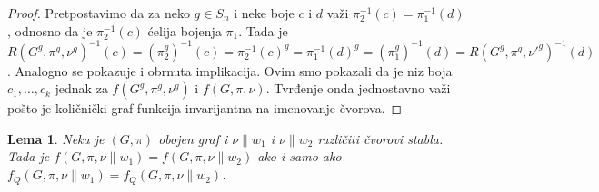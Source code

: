 \documentclass[12pt,oneside]{memoir}
\newtheorem{lemma}{Lema}
\theoremstyle{definition}
\begin{document}
  \begin{proof}
	  Pretpostavimo da za neko $g \in S_n$ i neke boje $c$ i $d$ važi
	  $\pi_2^{-1}(c) = \pi_1^{-1}(d)$, odnosno da je $\pi_2^{-1}(c)$ ćelija
	  bojenja $\pi_1$.  Tada je $R(G^g, \pi^g, \nu^g)^{-1}(c) =
	  (\pi_2^g)^{-1}(c) = \pi_2^{-1}(c)^g = \pi_1^{-1}(d)^g = (\pi_1^g)^{-1}(d)
	  = R(G^g, \pi^g, \nu'^g)^{-1}(d)$. Analogno se pokazuje i obrnuta
	  implikacija.  Ovim smo pokazali da je niz boja $c_1, \dots, c_k$ jednak
	  za $f(G^g, \pi^g, \nu^g)$ i $f(G, \pi, \nu)$. Tvrđenje onda jednostavno
	  važi pošto je količnički graf funkcija invarijantna na imenovanje
	  čvorova.
  \end{proof}

  \begin{lemma}
	  Neka je $(G, \pi)$ obojen graf i $\nu \| w_1$ i $\nu \| w_2$ različiti
	  čvorovi stabla. Tada je $f(G, \pi, \nu \| w_1) = f(G, \pi, \nu \| w_2)$
	  ako i samo ako $f_Q(G, \pi, \nu \| w_1) = f_Q(G, \pi, \nu \| w_2)$.
  \end{lemma}
  
\end{document}
